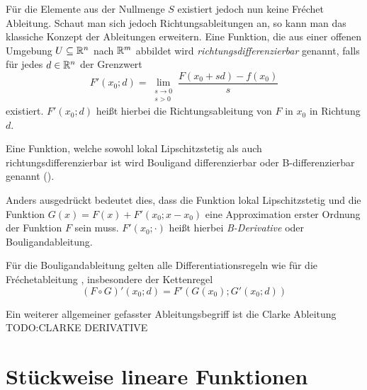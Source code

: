 Für die Elemente aus der Nullmenge $S$ existiert jedoch nun keine Fréchet Ableitung. Schaut man sich jedoch Richtungsableitungen an, so kann man das klassiche Konzept der Ableitungen erweitern. Eine Funktion, die aus einer offenen Umgebung $U\subseteq \mathbb{R}^n$ nach $\mathbb{R}^m$ abbildet wird \textit{richtungsdifferenzierbar} genannt, falls für jedes $d\in \mathbb{R}^n$ der Grenzwert
\[
 F'(x_0;d) = \lim_{\substack{s\to 0 \\ s>0}} \frac{F(x_0+sd)-f(x_0)}{s} 
\]
existiert. $F'(x_0;d)$ heißt hierbei die Richtungsableitung von $F$ in $x_0$ in Richtung $d$.

\begin{definition}[B-Differenzierbarkeit]
Eine Funktion, welche sowohl lokal Lipschitzstetig als auch richtungsdifferenzierbar ist wird Bouligand differenzierbar oder B-differenzierbar genannt (\cite[Def.3.1.2]{scholtes2012introduction}). 
\end{definition}

 Anders ausgedrückt bedeutet dies, dass die Funktion lokal Lipschitzstetig und die Funktion $G(x) = F(x)+F'(x_0;x-x_0)$ eine Approximation erster Ordnung der Funktion $F$ sein muss. $F'(x_0;\cdot)$ heißt hierbei \textit{B-Derivative} oder Bouligandableitung.

Für die Bouligandableitung gelten alle Differentiationsregeln wie für die Fréchetableitung \cite[Cor.3.1.1.]{scholtes2012introduction}, insbesondere der Kettenregel \cite[Thm. 3.1.1.]{scholtes2012introduction}
\begin{equation}
 \label{eq:bouligandChainRule}
 (F\circ G)'(x_0;d) = F'(G(x_0);G'(x_0;d)) 
\end{equation}

Ein weiterer allgemeiner gefasster Ableitungsbegriff ist die Clarke Ableitung \cite[]{clarke1975generalized}
TODO:CLARKE DERIVATIVE
\begin{definition}
 
\end{definition}



\section{Stückweise lineare Funktionen}
